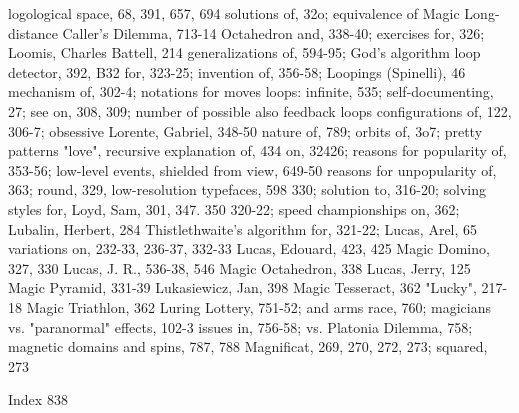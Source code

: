 logological space, 68, 391, 657, 694                 solutions of, 32o; equivalence of Magic
Long-distance Caller's Dilemma, 713-14               Octahedron and, 338-40; exercises for, 326;
Loomis, Charles Battell, 214                         generalizations of, 594-95; God's algorithm
loop detector, 392, B32                              for, 323-25; invention of, 356-58;
Loopings (Spinelli), 46                              mechanism of, 302-4; notations for moves
loops: infinite, 535; self-documenting, 27; see      on, 308, 309; number of possible
  also feedback loops                                configurations of, 122, 306-7; obsessive
Lorente, Gabriel, 348-50                             nature of, 789; orbits of, 3o7; pretty patterns
"love", recursive explanation of, 434                on, 32426; reasons for popularity of, 353-56;
low-level events, shielded from view, 649-50         reasons for unpopularity of, 363; round, 329,
low-resolution typefaces, 598                        330; solution to, 316-20; solving styles for,
Loyd, Sam, 301, 347. 350                             320-22; speed championships on, 362;
Lubalin, Herbert, 284                                Thistlethwaite's algorithm for, 321-22;
Lucas, Arel, 65                                      variations on, 232-33, 236-37, 332-33
Lucas, Edouard, 423, 425                            Magic Domino, 327, 330
Lucas, J. R., 536-38, 546                           Magic Octahedron, 338
Lucas, Jerry, 125                                   Magic Pyramid, 331-39
Lukasiewicz, Jan, 398                               Magic Tesseract, 362
"Lucky", 217-18                                     Magic Triathlon, 362
Luring Lottery, 751-52; and arms race, 760;         magicians vs. "paranormal" effects, 102-3
  issues in, 756-58; vs. Platonia Dilemma, 758;     magnetic domains and spins, 787, 788
                                                    Magnificat, 269, 270, 272, 273; squared, 273

 Index                                                                                          838

